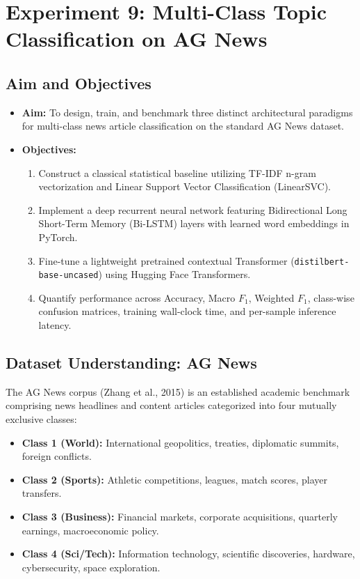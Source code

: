 \documentclass[12pt,a4paper]{report}
\begin{document}
\section{Experiment 9: Multi-Class Topic Classification on AG News}

\subsection{Aim and Objectives}
\begin{itemize}
    \item \textbf{Aim:} To design, train, and benchmark three distinct architectural paradigms for multi-class news article classification on the standard AG News dataset.
    \item \textbf{Objectives:}
    \begin{enumerate}
        \item Construct a classical statistical baseline utilizing TF-IDF n-gram vectorization and Linear Support Vector Classification (LinearSVC).
        \item Implement a deep recurrent neural network featuring Bidirectional Long Short-Term Memory (Bi-LSTM) layers with learned word embeddings in PyTorch.
        \item Fine-tune a lightweight pretrained contextual Transformer (\texttt{distilbert-base-uncased}) using Hugging Face Transformers.
        \item Quantify performance across Accuracy, Macro $F_1$, Weighted $F_1$, class-wise confusion matrices, training wall-clock time, and per-sample inference latency.
    \end{enumerate}
\end{itemize}

\subsection{Dataset Understanding: AG News}
The AG News corpus (Zhang et al., 2015) is an established academic benchmark comprising news headlines and content articles categorized into four mutually exclusive classes:
\begin{itemize}
    \item \textbf{Class 1 (World):} International geopolitics, treaties, diplomatic summits, foreign conflicts.
    \item \textbf{Class 2 (Sports):} Athletic competitions, leagues, match scores, player transfers.
    \item \textbf{Class 3 (Business):} Financial markets, corporate acquisitions, quarterly earnings, macroeconomic policy.
    \item \textbf{Class 4 (Sci/Tech):} Information technology, scientific discoveries, hardware, cybersecurity, space exploration.
\end{itemize}
\end{document}
